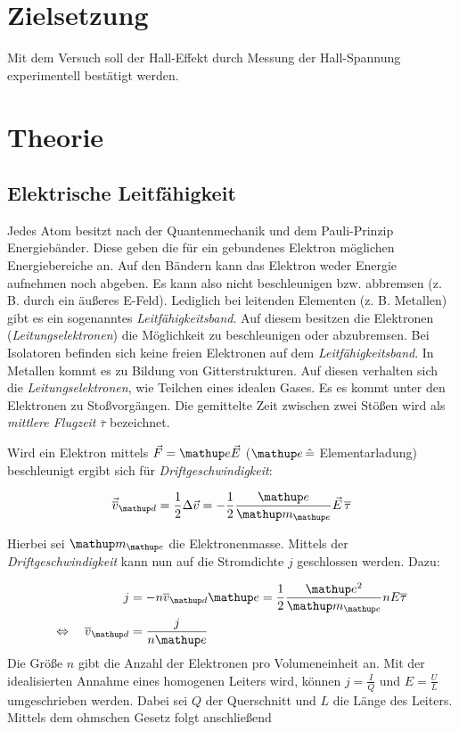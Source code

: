 \setcounter{page}{1}
\section*{Zielsetzung}
Mit dem Versuch soll der Hall-Effekt durch Messung der 
Hall-Spannung experimentell bestätigt werden.

\section{Theorie}

\subsection{Elektrische Leitfähigkeit}
Jedes Atom besitzt nach der Quantenmechanik und dem Pauli-Prinzip 
Energiebänder.
Diese geben die für ein gebundenes Elektron möglichen Energiebereiche an. Auf den Bändern kann das Elektron weder 
Energie aufnehmen noch abgeben. Es kann also 
nicht beschleunigen bzw. abbremsen (z. B. durch ein äußeres E-Feld).
Lediglich bei leitenden Elementen (z. B. Metallen) gibt es ein sogenanntes \emph{Leitfähigkeitsband}.
Auf diesem besitzen die Elektronen (\emph{Leitungselektronen}) die Möglichkeit zu beschleunigen oder abzubremsen.
Bei Isolatoren befinden sich keine freien Elektronen auf dem \emph{Leitfähigkeitsband}.
In Metallen kommt es zu Bildung von Gitterstrukturen. 
Auf diesen verhalten sich die \emph{Leitungselektronen}, wie Teilchen eines idealen Gases.
Es es kommt unter den Elektronen zu Stoßvorgängen.
Die gemittelte Zeit zwischen zwei Stößen wird als \emph{mittlere Flugzeit} $\overline{\tau}$ bezeichnet.

Wird ein Elektron mittels $\vec{F}=\map{e}\vec{E}$ ($\map{e}\, \hat{=}$ Elementarladung) beschleunigt 
ergibt sich für \emph{Driftgeschwindigkeit}:

\begin{equation}
\label{eq:drift_v}
\vec{\overline{v}}\ua{d}=\frac{1}{2}\Delta\vec{v}=-\frac{1}{2}\frac{\map{e}}{\map{m}\ua{e}}\vec{E}\,\overline{\tau}
\end{equation}

Hierbei sei $\map{m}\ua{e}$ die Elektronenmasse.
Mittels der \emph{Driftgeschwindigkeit} kann nun auf die Stromdichte $j$ geschlossen werden. Dazu:

\begin{align}
j&=-n\overline{v}\ua{d}\map{e}=\frac{1}{2}\frac{\map{e^2}}{\map{m}\ua{e}}n E\overline{\tau}\notag \\
\Leftrightarrow \quad \overline{v}\ua{d}&=\frac{j}{n\map{e}}\label{eq:stromdicht}
\end{align}
Die Größe $n$ gibt die Anzahl der Elektronen pro Volumeneinheit an.
Mit der idealisierten Annahme eines homogenen Leiters wird, können 
$j=\frac{I}{Q}$ und $E=\frac{U}{L}$ umgeschrieben werden.
Dabei sei $Q$ der Querschnitt und $L$ die Länge des Leiters.
Mittels dem ohmschen Gesetz folgt anschließend

